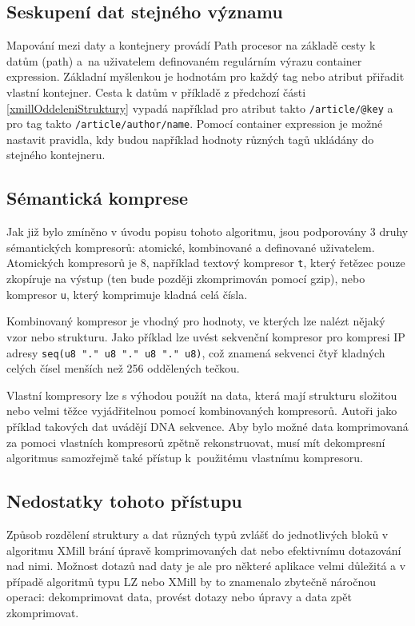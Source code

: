 \subsection{Seskupení dat stejného významu}
Mapování mezi daty a kontejnery provádí Path procesor na základě cesty k datům (path) a~na uživatelem definovaném regulárním výrazu container expression. Základní myšlenkou je hodnotám pro každý tag nebo atribut přiřadit vlastní kontejner. Cesta k datům v příkladě z předchozí části \ref{xmillOddeleniStruktury} vypadá například  pro atribut takto \texttt{/article/@key} a pro tag takto \texttt{/article/author/name}. Pomocí container expression je možné nastavit pravidla, kdy budou například hodnoty různých tagů ukládány do stejného kontejneru. \cite{xmill}

\subsection{Sémantická komprese}
Jak již bylo zmíněno v úvodu popisu tohoto algoritmu, jsou podporovány 3 druhy sé\-man\-ti\-ckých kompresorů: atomické, kombinované a definované uživatelem. Atomických kompresorů je 8, například textový kompresor \texttt{t}, který řetězec pouze zkopíruje na výstup (ten bude později zkomprimován pomocí gzip), nebo kompresor \texttt{u}, který komprimuje kladná celá čísla.

Kombinovaný kompresor je vhodný pro hodnoty, ve kterých lze nalézt nějaký vzor nebo strukturu. Jako příklad lze uvést sekvenční kompresor pro kompresi IP adresy \texttt{seq(u8 "." u8 "." u8 "." u8)}, což znamená sekvenci čtyř kladných celých čísel menších než 256 oddělených tečkou.

Vlastní kompresory lze s výhodou použít na data, která mají strukturu složitou nebo velmi těžce vyjádřitelnou pomocí kombinovaných kompresorů. Autoři jako příklad takových dat uvádějí DNA sekvence. Aby bylo možné data komprimovaná za pomoci vlastních kompresorů zpětně rekonstruovat, musí mít dekompresní algoritmus samozřejmě také přístup k~použitému vlastnímu kompresoru. \cite{xmill}

\subsection{Nedostatky tohoto přístupu}
Způsob rozdělení struktury a dat různých typů zvlášť do jednotlivých bloků v algoritmu XMill brání úpravě komprimovaných dat nebo efektivnímu dotazování nad nimi. Možnost dotazů nad daty je ale pro některé aplikace velmi důležitá a v případě algoritmů typu LZ nebo XMill by to znamenalo zbytečně náročnou operaci: dekomprimovat data, provést dotazy nebo úpravy a data zpět zkomprimovat.

